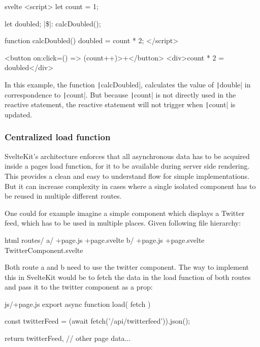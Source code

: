 \begin{myminted}[escapeinside=||, autogobble]{svelte}{}
<script>
    let count = 1;

    let doubled;
    |\$|: calcDoubled();

    function calcDoubled() {
    doubled = count * 2;
    }
</script>

<button on:click={() => (count++)}>+</button>
<div>{count} * 2 = {doubled}</div>
\end{myminted}

In this example, the function \texttt|calcDoubled|, calculates the value of \texttt|double| in correspondence to \texttt|count|. But because \texttt|count| is not directly used in the reactive statement, the reactive statement will not trigger when \texttt|count| is updated.

\subsubsection{Centralized load function}

SvelteKit's architecture enforces that all asynchronous data has to be acquired inside a pages load function, for it to be available during server side rendering. This provides a clean and easy to understand flow for simple implementations. But it can increase complexity in cases where a single isolated component has to be reused in multiple different routes.

One could for example imagine a simple component which displays a Twitter feed, which has to be used in multiple places. Given following file hierarchy:

\begin{myminted}{html}{}
routes/
  a/
    +page.js
    +page.svelte
  b/
    +page.js
    +page.svelte
  TwitterComponent.svelte
\end{myminted}

Both route a and b need to use the twitter component. The way to implement this in SvelteKit would be to fetch the data in the load function of both routes and pass it to the twitter component as a prop:

\begin{myminted}{js}{/+page.js}
export async function load({ fetch }) {

    const twitterFeed = (await fetch('/api/twitterfeed')).json();

    return {
        twitterFeed,
        // other page data...
    }
}

\end{myminted}

